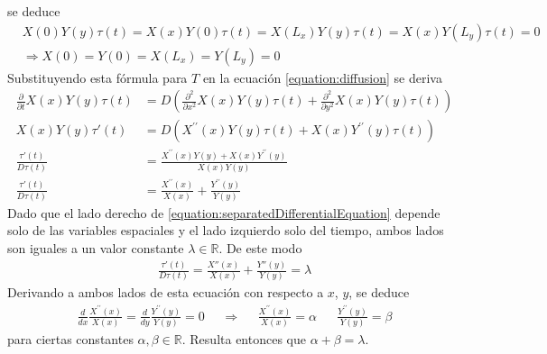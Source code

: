 \documentclass{article}
\newcommand{\realNumbers}{\mathbb{R}}
\begin{document}
    se deduce
    \begin{align}
      &X(0) Y(y) \tau(t)
      =
      X(x) Y(0) \tau(t)
      =
      X(L_x) Y(y) \tau(t)
      =
      X(x) Y(L_y) \tau(t)
      =
      0
      \\
      \label{equation:separatedInitialConditions}
      &\Rightarrow X(0) = Y(0) = X(L_x) = Y(L_y) = 0
    \end{align}
    Substituyendo esta fórmula para \(T\) en la ecuación \eqref{equation:diffusion} se deriva
    \begin{align}
      \frac{\partial}{\partial t} X(x) Y(y) \tau(t)
      &=
      D \left(
        \frac{\partial^2}{\partial x^2} X(x) Y(y) \tau(t)
        +
        \frac{\partial^2}{\partial y^2} X(x) Y(y) \tau(t)
      \right)
      \\
      X(x) Y(y) \tau'(t)
      &=
      D \left(
        X^{\prime\prime}(x) Y(y) \tau(t)
        +
        X(x) Y^{\prime\prime}(y) \tau(t)
      \right)
      \\
      \frac{\tau'(t)}{D \tau(t)}
      &=
      \frac{X^{\prime\prime}(x) Y(y) + X(x) Y^{\prime\prime}(y)}{X(x) Y(y)}
      \\
      \label{equation:separatedDifferentialEquation}
      \frac{\tau'(t)}{D \tau(t)}
      &=
      \frac{X^{\prime\prime}(x)}{X(x)}
      +
      \frac{Y^{\prime\prime}(y)}{Y(y)}
    \end{align}
    Dado que el lado derecho de \eqref{equation:separatedDifferentialEquation} depende solo de las variables espaciales y el lado izquierdo solo del tiempo, ambos lados son iguales a un valor constante \(\lambda \in \realNumbers\).
    De este modo
    \begin{align}
      \label{equation:tauLambda}
      \frac{\tau'(t)}{D \tau(t)}
      =
      \frac{X''(x)}{X(x)} + \frac{Y''(y)}{Y(y)}
      =
      \lambda
    \end{align}
    Derivando a ambos lados de esta ecuación con respecto a \(x\), \(y\), se deduce
    \begin{align}
      \frac{d}{d x} \frac{X^{\prime\prime}(x)}{X(x)} 
      =
      \frac{d}{d y} \frac{Y^{\prime\prime}(y)}{Y(y)}
      =
      0
      &&\Rightarrow
      &&\frac{X^{\prime\prime}(x)}{X(x)} = \alpha
      &&\frac{Y^{\prime\prime}(y)}{Y(y)} = \beta
    \end{align}
    para ciertas constantes \(\alpha, \beta \in \realNumbers\).
    Resulta entonces que \(\alpha + \beta = \lambda\).
\end{document}
